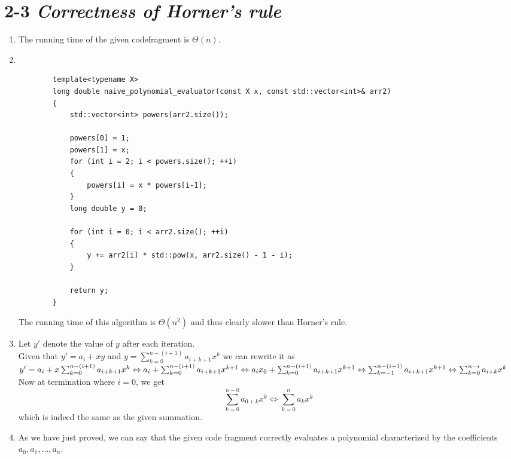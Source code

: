 \documentclass[11pt, letterpaper]{article}
\begin{document}
\section*{2-3 \textit{Correctness of Horner's rule}}
\begin{enumerate}[label=\alph*)]
    \item
        The running time of the given codefragment is $\Theta (n)$.
    \item
        ~\\
        \begin{lstlisting}
        template<typename X>
        long double naive_polynomial_evaluator(const X x, const std::vector<int>& arr2)
        {
            std::vector<int> powers(arr2.size());

            powers[0] = 1;
            powers[1] = x;
            for (int i = 2; i < powers.size(); ++i)
            {
                powers[i] = x * powers[i-1];
            }
            long double y = 0;

            for (int i = 0; i < arr2.size(); ++i)
            {
                y += arr2[i] * std::pow(x, arr2.size() - 1 - i);
            }

            return y;
        }
        \end{lstlisting}
        The running time of this algorithm is $\Theta (n^2)$ and thus clearly slower 
        than Horner's rule.
    \item
        Let $y'$ denote the value of $y$ after each iteration.\\
        Given that $y' = a_i + xy$ and $y = \sum_{k=0}^{n-(i+1)} a_{i+k+1}x^k$ we 
        can rewrite it as \\$y'=a_i + x \sum_{k=0}^{n-(i+1)} a_{i+k+1}x^k\\
        \Leftrightarrow
        a_i + \sum_{k=0}^{n-(i+1)} a_{i+k+1}x^{k+1}\\
        \Leftrightarrow
        a_i x_0 + \sum_{k=0}^{n-(i+1)} a_{i+k+1}x^{k+1}\\
        \Leftrightarrow
        \sum_{k=-1}^{n-(i+1)} a_{i+k+1}x^{k+1}\\
        \Leftrightarrow
        \sum_{k=0}^{n-i} a_{i+k}x^{k}\\
        $
        Now at termination where $i = 0$, we get
        \begin{equation}
        \sum_{k=0}^{n-0} a_{0+k}x^{k} \Leftrightarrow \sum_{k=0}^{n} a_{k}x^{k}
        \end{equation}
        which is indeed the same as the given summation.
    \item
        As we have just proved, we can say that the given code fragment correctly
        evaluates a polynomial characterized by the coefficients $a_0,a_1,\dots,a_n$.
\end{enumerate}
\pagebreak
\end{document}
